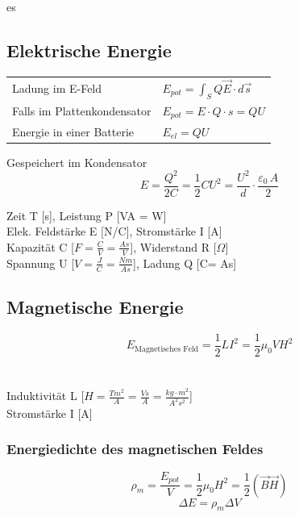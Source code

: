 es\documentclass[a4paper, fontsize=8pt, landscape]{scrartcl}
\begin{document}
\begin{multicols*}{4}
\subsection{Elektrische Energie}
    \renewcommand{\arraystretch}{1.6}
    \begin{tabular}[t]{@{}l l}
    Ladung im E-Feld & $E_{pot} = \int_S Q \vec E\cdot d\vec s $\\
    Falls im Plattenkondensator & $E_{pot} = E \cdot Q\cdot s = QU$\\
    Energie in einer Batterie & $E_{el}  = QU$\\
    \end{tabular}
    \vspace{3em}
    Gespeichert im Kondensator\\
    \[E = \frac{Q^2}{2C} = \frac{1}{2}C U^2 = \frac{U^2}{d} \cdot \frac{\varepsilon_0\,A}{2}\]
 
    
  
    \vspace{2.5mm}
    Zeit T [s], Leistung P [VA = W]\\
    Elek. Feldstärke E [N/C], Stromstärke I [A]\\
    Kapazität C [$F=\frac{C}{V}=\frac{As}{V}$], Widerstand R [$\Omega$] \\
    Spannung U [$V = \frac{J}{C}=\frac{Nm}{As} $], Ladung Q [C= As]\\
    

\subsection{Magnetische Energie}
    \[E_{\text{Magnetisches Feld}} = \frac{1}{2}LI^2 = \frac{1}{2}\mu_0V H^2\]\\\\
    
    \noindent
    Induktivität L [$H= \frac{Tm^2}{A}=\frac{Vs}{A} = \frac{kg \cdot m^2}{A^2s^2}$]\\
    Stromstärke I [A]\\

\subsubsection{Energiedichte des magnetischen Feldes}
    \[\rho_m = \frac{E_{pot}}{V} = \frac{1}{2}\mu_0 H^2 = \frac{1}{2}(\vec B \vec H)\]
    \[\Delta E = \rho_m\Delta V\]


\end{multicols*}
\end{document}
